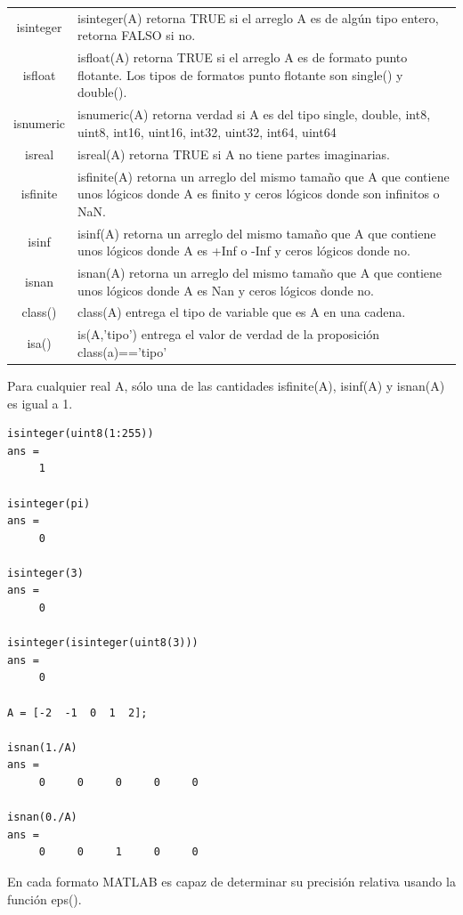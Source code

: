 \documentclass[11pt]{article}
\begin{document}
\begin{longtable}{|c||p{}|}
\hline
isinteger 	&	isinteger(A) retorna TRUE si el arreglo A es de alg\'un tipo entero, retorna FALSO  si no. \\
isfloat 	& 	isfloat(A) retorna TRUE si el arreglo A es de formato punto flotante. Los tipos de formatos punto flotante son single() y double(). \\
isnumeric	& 	isnumeric(A) retorna verdad si A es del tipo single, double, int8, uint8, int16, uint16, int32, uint32, int64, uint64 \\
isreal 		& 	isreal(A) retorna TRUE si A no tiene partes imaginarias. \\
isfinite	& 	isfinite(A)  retorna un arreglo del mismo tama\~{n}o que A que contiene unos l\'ogicos donde A es finito y ceros l\'ogicos donde son infinitos o NaN. \\
isinf 		& 	isinf(A)  retorna un arreglo del mismo tama\~{n}o que A que contiene unos l\'ogicos donde A es +Inf o -Inf y ceros l\'ogicos donde no. \\
isnan		& 	isnan(A)  retorna un arreglo del mismo tama\~{n}o que A que contiene unos l\'ogicos donde A es Nan y ceros l\'ogicos donde no.\\
class()		& 	class(A) entrega el tipo de variable que es A en una cadena. \\
isa()		&   is(A,'tipo') entrega el valor de verdad de la proposici\'on class(a)=='tipo'
		\\
\hline
\end{longtable}

Para cualquier real A, s\'olo una de las cantidades isfinite(A), isinf(A) y isnan(A) es igual a 1.

\begin{verbatim}
isinteger(uint8(1:255))
ans =
     1

isinteger(pi)
ans =
     0

isinteger(3)
ans =
     0

isinteger(isinteger(uint8(3)))
ans =
     0

A = [-2  -1  0  1  2];

isnan(1./A)
ans =
     0     0     0     0     0

isnan(0./A)
ans =
     0     0     1     0     0
\end{verbatim}

En cada formato MATLAB es capaz de determinar su precisi\'on relativa usando la funci\'on eps().
\end{document}

